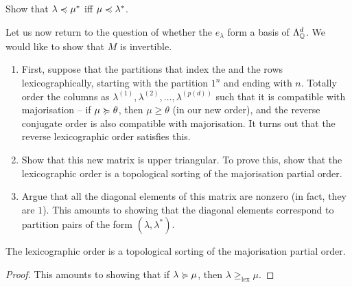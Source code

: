 

	\begin{exercise}
		Show that $\lambda \preccurlyeq \mu^*$ iff $\mu \preccurlyeq \lambda^*$.
	\end{exercise}
	
	Let us now return to the question of whether the $e_\lambda$ form a basis of $\Lambda_{\mathbb{Q}}^d$. We would like to show that $M$ is invertible.

	\begin{enumerate}
		\item First, suppose that the partitions that index the and the rows lexicographically, starting with the partition $1^n$ and ending with $n$. Totally order the columns as $\lambda^{(1)},\lambda^{(2)},\ldots,\lambda^{(p(d))}$ such that it is compatible with majorisation -- if $\mu \succcurlyeq \theta$, then $\mu \ge \theta$ (in our new order), and the reverse conjugate order is also compatible with majorisation. It turns out that the reverse lexicographic order satisfies this. 
		\item Show that this new matrix is upper triangular. To prove this, show that the lexicographic order is a topological sorting of the majorisation partial order.
		\item Argue that all the diagonal elements of this matrix are nonzero (in fact, they are $1$). This amounts to showing that the diagonal elements correspond to partition pairs of the form $(\lambda,\lambda^*)$.
	\end{enumerate}

	\begin{prop}
		\label{lem: invertible M 2}
		The lexicographic order is a topological sorting of the majorisation partial order.
	\end{prop}
	\begin{proof}
		This amounts to showing that if $\lambda \succcurlyeq \mu$, then $\lambda \ge_{\text{lex}} \mu$. 
	\end{proof}

